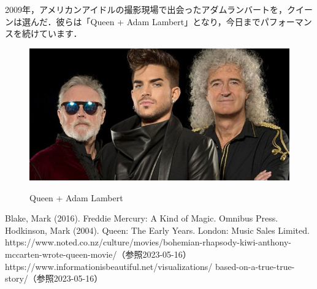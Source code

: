 \documentclass[a4j, twocolumn]{jarticle}
\begin{document}
2009年，アメリカンアイドルの撮影現場で出会ったアダムランバートを，クイーンは選んだ．彼らは「Queen + Adam Lambert」となり，今日までパフォーマンスを続けています．

\begin{figure}[htb]
  \begin{center}
      \includegraphics[scale=0.3]{queen_adam_lambert.jpg}
      \caption{Queen + Adam Lambert}
      \vspace{-15pt}
      \label{QueenAdam}
  \end{center}
\end{figure}

\vspace{-15pt}

\begin{thebibliography}{99}
  Blake, Mark (2016). Freddie Mercury: A Kind of Magic. Omnibus Press.
  Hodkinson, Mark (2004). Queen: The Early Years. London: Music Sales Limited.
  https://www.noted.co.nz/culture/movies/bohemian-rhapsody-kiwi-anthony-mccarten-wrote-queen-movie/（参照2023-05-16）
  https://www.informationisbeautiful.net/visualizations/ based-on-a-true-true-story/（参照2023-05-16）

\end{thebibliography}
\end{document}
